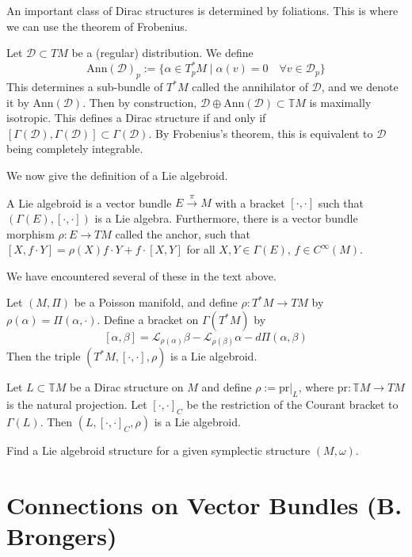 An important class of Dirac structures is determined by foliations. This is where we can use the theorem of Frobenius.
\begin{example}
  Let $\mathcal{D}\subset TM$ be a (regular) distribution. We define $$\text{Ann}(\mathcal{D})_p:=\{\alpha\in T_p^*M\mid \alpha(v)=0\quad\forall v\in \mathcal{D}_p\}$$
  This determines a sub-bundle of $T^*M$ called the annihilator of $\mathcal{D}$, and we denote it by $\text{Ann}(\mathcal{D})$. Then by construction, $\mathcal{D}\oplus\text{Ann}(\mathcal{D})\subset\mathbb{T}M$ is maximally isotropic. This defines a Dirac structure if and only if $[\Gamma(\mathcal{D}),\Gamma(\mathcal{D})]\subset\Gamma(\mathcal{D})$. By Frobenius's theorem, this is equivalent to $\mathcal{D}$ being completely integrable.
\end{example}
We now give the definition of a Lie algebroid.
\begin{definition}
  A Lie algebroid is a vector bundle $E\xrightarrow{\pi}M$ with a bracket $[\cdot,\cdot]$ such that $(\Gamma(E),[\cdot,\cdot])$ is a Lie algebra. Furthermore, there is a vector bundle morphism $\rho:E\to TM$ called the anchor, such that $[X,f\cdot Y]=\rho(X)f\cdot Y+f\cdot[X,Y]$ for all $X,Y\in\Gamma(E)$, $f\in C^\infty(M)$.
\end{definition}
We have encountered several of these in the text above.
\begin{example}
  Let $(M,\Pi)$ be a Poisson manifold, and define $\rho:T^*M\to TM$ by $\rho(\alpha)=\Pi(\alpha,\cdot)$. Define a bracket on $\Gamma(T^*M)$ by $$[\alpha,\beta]=\mathcal{L}_{\rho(\alpha)}\beta-\mathcal{L}_{\rho(\beta)}\alpha-d\Pi(\alpha,\beta)$$
  Then the triple $(T^*M,[\cdot,\cdot],\rho)$ is a Lie algebroid.
\end{example}
\begin{example}
Let $L\subset\mathbb{T}M$ be a Dirac structure on $M$ and define $\rho:=\text{pr}|_L$, where $\text{pr}:\mathbb{T}M\to TM$ is the natural projection. Let $[\cdot,\cdot]_C$ be the restriction of the Courant bracket to $\Gamma(L)$. Then $(L,[\cdot,\cdot]_C,\rho)$ is a Lie algebroid.
\end{example}
\begin{exercise}
  Find a Lie algebroid structure for a given symplectic structure $(M,\omega)$.
\end{exercise}

\chapter{Connections on Vector Bundles (B. Brongers)}


